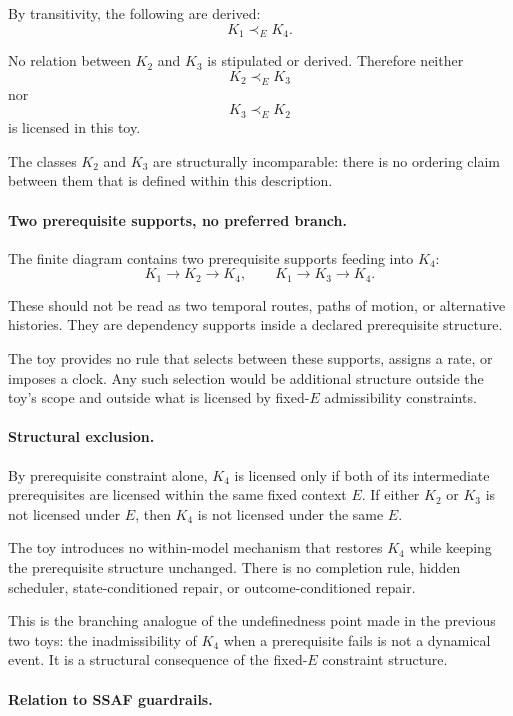 \documentclass[aps,prx,onecolumn,11pt]{revtex4-2}
\theoremstyle{plain}
\theoremstyle{definition}
\theoremstyle{remark}
\begin{document}
By transitivity, the following are derived:
\[
K_1\prec_E K_4.
\]

No relation between \(K_2\) and \(K_3\) is stipulated or derived.
Therefore neither
\[
K_2\prec_E K_3
\]
nor
\[
K_3\prec_E K_2
\]
is licensed in this toy.

The classes \(K_2\) and \(K_3\) are structurally incomparable: there is
no ordering claim between them that is defined within this description.

\paragraph{Two prerequisite supports, no preferred branch.}

The finite diagram contains two prerequisite supports feeding into
\(K_4\):
\[
K_1\to K_2\to K_4,
\qquad
K_1\to K_3\to K_4.
\]

These should not be read as two temporal routes, paths of motion, or
alternative histories. They are dependency supports inside a declared
prerequisite structure.

The toy provides no rule that selects between these supports, assigns a
rate, or imposes a clock. Any such selection would be additional
structure outside the toy's scope and outside what is licensed by
fixed-\(E\) admissibility constraints.

\paragraph{Structural exclusion.}

By prerequisite constraint alone, \(K_4\) is licensed only if both of
its intermediate prerequisites are licensed within the same fixed
context \(E\). If either \(K_2\) or \(K_3\) is not licensed under \(E\),
then \(K_4\) is not licensed under the same \(E\).

The toy introduces no within-model mechanism that restores \(K_4\) while
keeping the prerequisite structure unchanged. There is no completion
rule, hidden scheduler, state-conditioned repair, or
outcome-conditioned repair.

This is the branching analogue of the undefinedness point made in the
previous two toys: the inadmissibility of \(K_4\) when a prerequisite
fails is not a dynamical event. It is a structural consequence of the
fixed-\(E\) constraint structure.

\paragraph{Relation to SSAF guardrails.}
\end{document}
